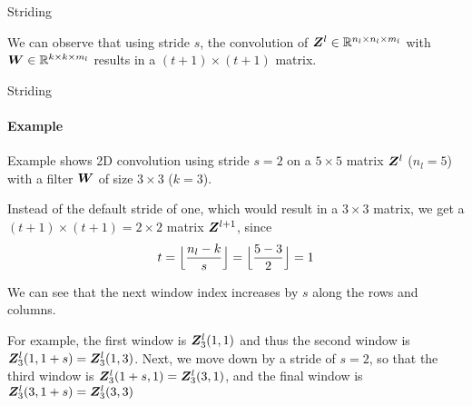 \begin{frame}{Striding}
\medskip

We can observe that using stride $s$, the convolution of $\bZ^l \in
\setR^{n_l \times n_l \times m_l}$ with
$\bW \in \setR^{k \times k \times m_l}$ results in a $(t+1) \times (t+1)$ matrix.
\end{frame}
%
%
%
\begin{frame}{Striding}
\framesubtitle{Example}
Example shows 2D convolution using stride $s=2$
    on a $5 \times 5$ matrix $\bZ^l$ ($n_l=5$) with a filter $\bW$ of size $3
    \times 3$ ($k=3$).

	\medskip

    Instead of the default stride of one, which would result in a $3
    \times 3$ matrix, we get a $(t+1) \times (t+1) = 2 \times 2$ matrix
    $\bZ^{l+1}$, since
    \begin{align*}
        t=\floor[\Big]{\frac{n_l-k}{s}} = \floor[\Big]{\frac{5-3}{2}} = 1
    \end{align*}

    We can see that the next window index increases by $s$ along the rows
    and columns. 

	\medskip

	For example, the first window is $\bZ^l_3(1,1)$ and
    thus the second window is $\bZ^l_3(1,1+s) = \bZ^l_3(1,3)$.
    Next, we move down by a stride of
    $s=2$, so that the third window is $\bZ^l_3(1+s,1) = \bZ^l_3(3,1)$,
    and the final window is $\bZ^l_3(3,1+s)
    = \bZ^l_3(3,3)$ %
\end{frame}
